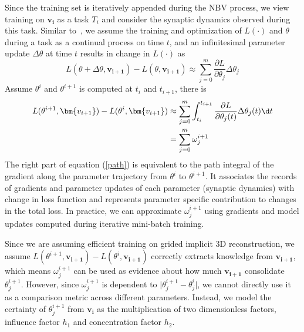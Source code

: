 Since the training set is iteratively appended during the NBV process, we view training on $\bm{v_i}$ as a task $T_i$ and consider the synaptic dynamics observed during this task.
Similar to~\cite{zenke2017continual}, we assume the training and optimization of $L(\cdot)$ and $\theta$ during a task as a continual process on time $t$, and an infinitesimal parameter update $\Delta\theta$ at time $t$ results in change in $L(\cdot)$ as 
\begin{equation}
    L(\theta + \Delta\theta, \bm{v_{i+1}}) - L(\theta, \bm{v_{i+1}}) \approx \sum_{j=0}^{m} \frac{\partial L}{\partial \theta_j} \Delta\theta_j 
\end{equation}
Assume $\theta^i$ and $\theta^{i+1}$  is computed at $t_i$ and $t_{i+1}$, there is 
\begin{equation}
\begin{split}
    L(\theta^{i+1}, \bm{v_{i+1}}) - L(\theta^i, \bm{v_{i+1}}) 
        & \approx\sum_{j=0}^{m}\int_{t_i}^{t_{i+1}} \frac{\partial L}{\partial \theta_j(t)} \Delta \theta_j(t) \d t \\
        & = \sum_{j=0}^{m} \omega_j^{i+1}
\end{split}
\label{path}
\end{equation}
The right part of equation (\ref{path}) is equivalent to the path integral of the gradient along the parameter trajectory from $\theta^{i}$ to $\theta^{i+1}$.
It associates the records of gradients and parameter updates of each parameter (synaptic dynamics) with change in loss function and represents parameter specific contribution to changes in the total loss.
In practice, we can approximate $\omega_j^{i+1}$ using gradients and model updates computed during iterative mini-batch training.

Since we are assuming efficient training on grided implicit 3D reconstruction, we assume $L(\theta^{i+1}, \bm{v_{i+1}}) - L(\theta^i, \bm{v_{i+1}})$ correctly extracts knowledge from $\bm{v_{i+1}}$, which means $\omega_j^{i+1}$ can be used as evidence about how much $\bm{v_{i+1}}$ consolidate $\theta_j^{i+1}$.
However, since $\omega_j^{i+1}$ is dependent to $\lvert\theta_j^{i+1} - \theta_j^{i}\rvert$, we cannot directly use it as a comparison metric across different parameters.
Instead, we model the certainty of $\theta_j^{i+1}$ from $\bm{v_i}$ as the multiplication of two dimensionless factors, influence factor $h_1$ and concentration factor $h_2$.


